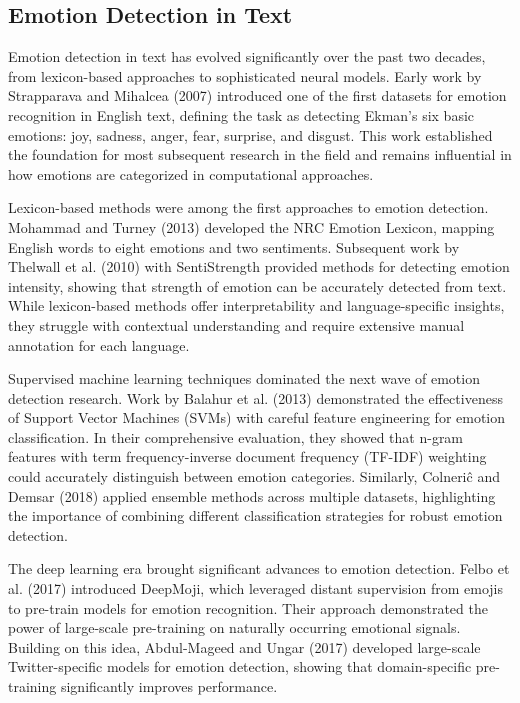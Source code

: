 \documentclass[a4paper,12pt]{extarticle}
\begin{document}
\subsection{Emotion Detection in Text}

Emotion detection in text has evolved significantly over the past two decades, from lexicon-based approaches to sophisticated neural models. Early work by Strapparava and Mihalcea (2007) introduced one of the first datasets for emotion recognition in English text, defining the task as detecting Ekman's six basic emotions: joy, sadness, anger, fear, surprise, and disgust. This work established the foundation for most subsequent research in the field and remains influential in how emotions are categorized in computational approaches.

Lexicon-based methods were among the first approaches to emotion detection. Mohammad and Turney (2013) developed the NRC Emotion Lexicon, mapping English words to eight emotions and two sentiments. Subsequent work by Thelwall et al. (2010) with SentiStrength provided methods for detecting emotion intensity, showing that strength of emotion can be accurately detected from text. While lexicon-based methods offer interpretability and language-specific insights, they struggle with contextual understanding and require extensive manual annotation for each language.

Supervised machine learning techniques dominated the next wave of emotion detection research. Work by Balahur et al. (2013) demonstrated the effectiveness of Support Vector Machines (SVMs) with careful feature engineering for emotion classification. In their comprehensive evaluation, they showed that n-gram features with term frequency-inverse document frequency (TF-IDF) weighting could accurately distinguish between emotion categories. Similarly, Colneriĉ and Demsar (2018) applied ensemble methods across multiple datasets, highlighting the importance of combining different classification strategies for robust emotion detection.

The deep learning era brought significant advances to emotion detection. Felbo et al. (2017) introduced DeepMoji, which leveraged distant supervision from emojis to pre-train models for emotion recognition. Their approach demonstrated the power of large-scale pre-training on naturally occurring emotional signals. Building on this idea, Abdul-Mageed and Ungar (2017) developed large-scale Twitter-specific models for emotion detection, showing that domain-specific pre-training significantly improves performance.
\end{document}
